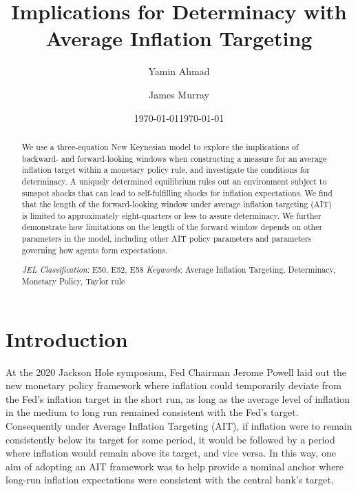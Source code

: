 \documentclass[english,authoryear,12pt]{elsarticle}
\begin{document}
	\begin{frontmatter}
		\title{Implications for Determinacy with Average Inflation Targeting}
		\date{\today}
		\author[1]{Yamin Ahmad}
		\author[2]{James Murray}

		\address[1]{Dept. of Economics, University of Wisconsin - Whitewater, 809 W. Starin Road, Whitewater, WI 53190, USA}
		\address[2]{Dept. of Economics, University of Wisconsin - La Crosse, 1725 State St., La Crosse, WI 54601, USA}

	\date{\today}

	\begin{abstract}
		We use a three-equation New Keynesian model to explore the implications of backward- and forward-looking windows when constructing a measure for an average inflation target within a monetary policy rule, and investigate the conditions for determinacy. A uniquely determined equilibrium rules out an environment subject to sunspot shocks that can lead to self-fulfilling shocks for inflation expectations. We find that the length of the forward-looking window under average inflation targeting (AIT) is limited to approximately eight-quarters or less to assure determinacy. We further demonstrate how limitations on the length of the forward window depends on other parameters in the model, including other AIT policy parameters and parameters governing how agents form expectations.

		\begin{flushleft}
			{\it JEL Classification}: E50, E52, E58 \newline
			{\it Keywords}: Average Inflation Targeting, Determinacy, Monetary Policy, Taylor rule
		\end{flushleft}
	\end{abstract}

\end{frontmatter}

\renewcommand{\thefootnote}{\arabic{footnote}}%
\setcounter{page}{1}%
\setcounter{footnote}{0}%


\section{\label{Intro}Introduction}
At the 2020 Jackson Hole symposium, Fed Chairman Jerome Powell laid out the new monetary policy framework where inflation could temporarily deviate from the Fed's inflation target in the short run, as long as the average level of inflation in the medium to long run remained consistent with the Fed's target. Consequently under Average Inflation Targeting (AIT), if inflation were to remain consistently below its target for some period, it would be followed by a period where inflation would remain above its target, and vice versa. In this way, one aim of adopting an AIT framework was to help provide a nominal anchor where long-run inflation expectations were consistent with the central bank's target.
\end{document}
